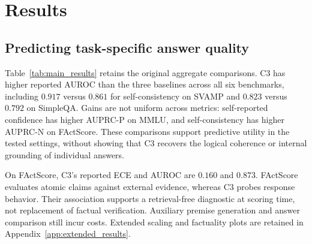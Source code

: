 \documentclass[11pt]{article}
\theoremstyle{plain}
\theoremstyle{definition}
\theoremstyle{remark}
\newif\ifrevisionmarkup
\DeclareRobustCommand{\revisioncolor}{\ifrevisionmarkup\color{red}\fi}
\DeclareRobustCommand{\revised}[1]{{\revisioncolor #1}}
\newenvironment{revision}{\par\begingroup\revisioncolor}{\par\endgroup}
\begin{document}
\begin{table}[t]
\caption{\revised{Original six-benchmark results, reported as averages over 16 models. Numerical entries are retained from the source manuscript. Shading indicates the best reported value within each benchmark and metric. ECE is lower-is-better; the ranking metrics are higher-is-better. The added FreshQA and TopicMisinfo studies are reported separately with explicit estimator names and sample counts. Appendix~\ref{app:revision_audit} identifies the remaining provenance checks for the original score implementations.}}
\label{tab:main_results}
\end{table}

\begin{revision}
\section{Results}
\subsection{Predicting task-specific answer quality}
Table~\ref{tab:main_results} retains the original aggregate comparisons. C3 has higher reported AUROC than the three baselines across all six benchmarks, including $0.917$ versus $0.861$ for self-consistency on SVAMP and $0.823$ versus $0.792$ on SimpleQA. Gains are not uniform across metrics: self-reported confidence has higher AUPRC-P on MMLU, and self-consistency has higher AUPRC-N on FActScore. These comparisons support predictive utility in the tested settings, without showing that C3 recovers the logical coherence or internal grounding of individual answers.

On FActScore, C3's reported ECE and AUROC are $0.160$ and $0.873$. FActScore evaluates atomic claims against external evidence, whereas C3 probes response behavior. Their association supports a retrieval-free diagnostic at scoring time, not replacement of factual verification. Auxiliary premise generation and answer comparison still incur costs. Extended scaling and factuality plots are retained in Appendix~\ref{app:extended_results}.
\end{revision}
\end{document}
